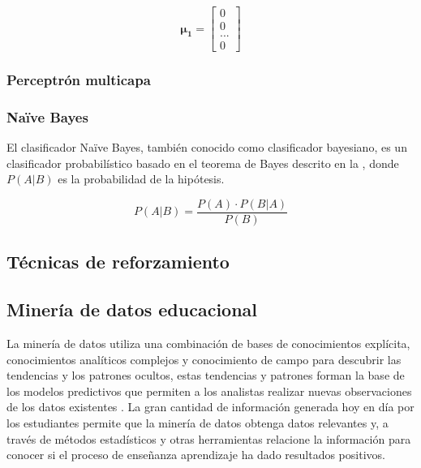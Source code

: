 \begin{equation}
 \pmb{\mu_1} = \begin{bmatrix}0\\0\\...\\0\end{bmatrix}
\end{equation}

\subsubsection*{Perceptrón multicapa}

\begin{figure}[H]
	\centering
	
	\label{fig:multilayer-perceptron}
\end{figure}

\subsubsection*{Na\"ive Bayes}
El clasificador Na\"ive Bayes, también conocido como clasificador bayesiano, es un clasificador probabilístico basado en el teorema de Bayes descrito en la , donde $P(A|B)$ es la probabilidad de la hipótesis.

\begin{equation}
 P(A|B) = \frac{P(A) \cdot P(B|A)}{P(B)}
 \label{eq:naive-bayes}
\end{equation}


\subsection{Técnicas de reforzamiento}


\begin{figure}[H]
	\centering
	
	\label{fig:decision-tree}
\end{figure}

\subsection{Minería de datos educacional}
La minería de datos utiliza una combinación de bases de conocimientos explícita, conocimientos analíticos complejos y conocimiento de campo para descubrir las tendencias y los patrones ocultos, estas tendencias y patrones forman la base de los modelos predictivos que permiten a los analistas realizar nuevas observaciones de los datos existentes \parencite{luan2002data}. La gran cantidad de información generada hoy en día por los estudiantes permite que la minería de datos obtenga datos relevantes y, a través de métodos estadísticos y otras herramientas relacione la información para conocer si el proceso de enseñanza aprendizaje ha dado resultados positivos. 

